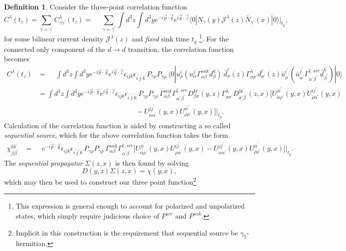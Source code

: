 \documentclass[prd,12pt,superscriptaddress,tightenlines,nofootinbib]{revtex4}
\def\a{{\alpha}}
\def\b{{\beta}}
\def\g{{\gamma}}
\def\G{{\Gamma}}
\def\l{{\lambda}}
\def\s{{\sigma}}
\def\ip{{i^\prime}}
\def\jp{{j^\prime}}
\def\kp{{k^\prime}}
\def\ap{{\alpha^\prime}}
\def\bp{{\beta^\prime}}
\def\gp{{\gamma^\prime}}
\def\rp{{\rho^\prime}}
\def\sp{{\sigma^\prime}}
\theoremstyle{plain}
\theoremstyle{definition}
\newtheorem{defn}[thm]{Definition}
\theoremstyle{remark}
\begin{document}
\begin{defn}
Consider the three-point correlation function 
\begin{equation}
C^\l (t_z) = \sum_{\g = \gp}C^\l_{\g\gp} (t_z) = \phantom{-} \sum_{\g = \gp} \int d^3 z \int d^3 y  e^{- i \vec{p} \cdot \vec{y}} e^{i \vec{q} \cdot \vec{z}} \langle 0| N_{\g} (y) \mathcal{J}^{\l}(z) \bar{N}_{\gp}(x) |0\rangle \Big|_{t_y},
\end{equation}
for some bilinear current density $\mathcal{J}^{\l}(z)$ and \emph{fixed} sink time $t_y$ \footnote{This expression is general enough to account for polarized and unpolarized states, which simply require judicious choice of $P^{src}$ and $P^{snk}$. }. For the connected only component of the $d \rightarrow d$ transition, the correlation function becomes
\begin{align}
C^\l (t_z) &= \phantom{-} \int d^3 z \int d^3 y  e^{- i \vec{p} \cdot \vec{y}} e^{i \vec{q} \cdot \vec{z}} \epsilon_{ijk} \epsilon_{\ip\jp\kp} P_{\g\rho} P_{\g\rp} 
	\langle 0| 
		u^i_\rho (u^j_\a \G^{snk}_{\a\b} d^k_\b ) \ 
		\bar{d}^l_\s(z) \G^\l_{\s\sp} d^l_{\sp}(z)
		\bar{u}^\ip_\rp (\bar{u}^{\jp}_{\ap} \G^{\dagger,src}_{\ap\bp} \bar{d}^\kp_\bp ) 
	|0\rangle
\nonumber\\&= 
\int d^3 z \int d^3 y  e^{- i \vec{p} \cdot \vec{y}} e^{i \vec{q} \cdot \vec{z}} \epsilon_{ijk} \epsilon_{\ip\jp\kp} P_{\g\rho} P_{\g\rp}  \G^{snk}_{\a\b}  \G^{\dagger,src}_{\ap\bp}
     D^{kl}_{\b\s}(y,z)\G^\l_{\s\sp} D^{l \kp}_{\sp\bp}(z,x)
     \Big[
     U^{j\ip}_{\a\rp}(y,x)U^{i\jp}_{\rho\ap}(y,x)
\nonumber\\&\qquad\qquad\qquad\qquad\qquad\qquad\qquad
     - U^{j\jp}_{\a\ap}(y,x)U^{i\ip}_{\rho\rp}(y,x)
     \Big]\Big|_{t_y}.
\end{align}
Calculation of the correlation function is aided by constructing a so called \emph{sequential source}, which for the above correlation function takes the form
\begin{align}
\chi^{ k\kp}_{\b\bp} &= \phantom{-}  e^{- i \vec{p} \cdot \vec{y}}  \epsilon_{ijk} \epsilon_{\ip\jp\kp} P_{\g\rho} P_{\g\rp} \G^{snk}_{\a\b} \G^{\dagger,src}_{\ap\bp}   
  \Big[
     U^{j\ip}_{\a\rp}(y,x)U^{i\jp}_{\rho\ap}(y,x)
     - U^{j\jp}_{\a\ap}(y,x)U^{i\ip}_{\rho\rp}(y,x)
     \Big]\Big|_{t_y}.
\end{align}
The \emph{sequential propagator} $\Sigma(z,x)$ is then found by solving
\begin{equation}
D (y,z) \Sigma (z,x) = \chi (y,x),
\end{equation}
which may then be used to construct our three point function\footnote{Implicit in this construction is the requirement that sequential source be $\gamma_5$-hermitian. }

\end{defn}
\end{document}
